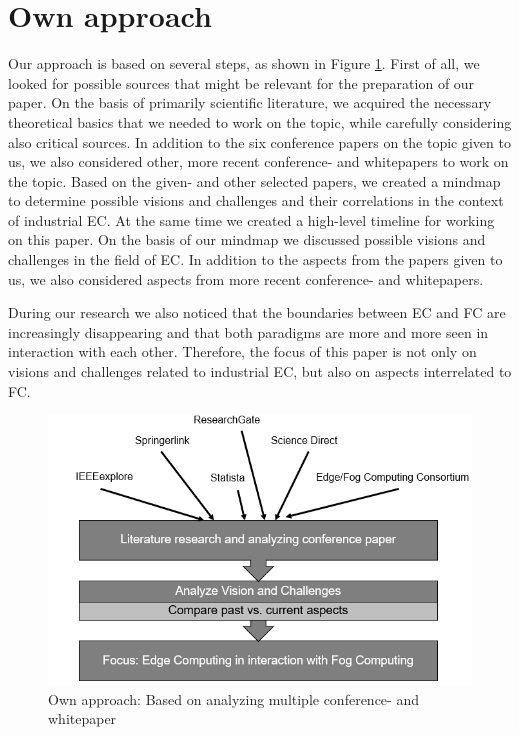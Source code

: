 \section{Own approach}\label{sec:approach}\par
Our approach is based on several steps, as shown in Figure \ref{fig:our_approach}. First of all, we looked for possible sources that might be relevant for the preparation of our paper. 
On the basis of primarily scientific literature, we acquired the necessary theoretical basics that we needed to work on the topic, while carefully considering also critical sources.
In addition to the six conference papers on the topic given to us, we also considered other, more recent conference- and whitepapers to work on the topic.
Based on the given- and other selected papers, we created a mindmap to determine possible visions and challenges and their correlations in the context of industrial EC. At the same time we created a high-level timeline for working on this paper.
On the basis of our mindmap we discussed possible visions and challenges in the field of EC. In addition to the aspects from the papers given to us, we also considered aspects from more recent conference- and whitepapers.\par
During our research we also noticed that the boundaries between EC and FC are increasingly disappearing and that both paradigms are more and more seen in interaction with each other.
Therefore, the focus of this paper is not only on visions and challenges related to industrial EC, but also on aspects interrelated to FC.

\begin{figure}[h]
    \includegraphics[width=1\textwidth,height=0.65\textwidth]{resources/images/our_approach.png}
    \caption{Own approach: Based on analyzing multiple conference- and whitepaper}
    \label{fig:our_approach}
\end{figure}

